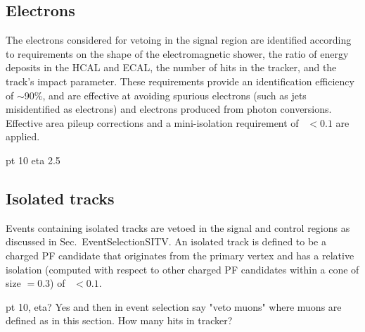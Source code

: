 \subsection*{Electrons}


The electrons considered for vetoing in the signal region are identified 
according to requirements on the shape of the electromagnetic shower, the ratio 
of energy deposits in the HCAL and ECAL, the number of hits in the tracker, and 
the track's impact parameter.  %
These requirements provide an identification efficiency of $\sim$90\%, and are 
effective at %
avoiding spurious electrons (such as jets misidentified as 
electrons) and electrons produced from photon conversions. %
Effective area pileup corrections and a mini-isolation requirement of 
\miniiso~$ < 0.1$ are applied.

pt 10 eta 2.5

\subsection*{Isolated tracks}

Events containing isolated tracks are vetoed in the signal and control regions 
as discussed in Sec.~EventSelectionSITV. An isolated track is defined to be a 
charged PF candidate that originates from the primary vertex and has a relative 
isolation (computed with respect to other charged PF candidates within a cone 
of size \DR$=0.3$) of \reliso~$ < 0.1$.

pt 10, eta?
Yes and then in event selection say "veto muons" where muons are defined as in 
this section.
How many hits in tracker?

